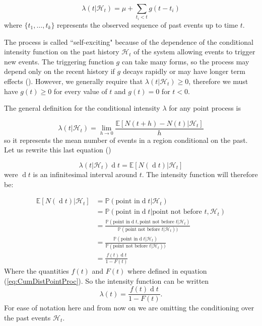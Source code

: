 \documentclass[11pt,a4paper]{article}
\renewcommand{\d}[1]{\ensuremath{\operatorname{d}\!{#1}}}
\begin{document}
\begin{equation*}
    \lambda(t|\mathcal{H}_t) = \mu + \sum_{t_i < t} g(t - t_i)
\end{equation*}
where $\{ t_1, \dots, t_k\}$ represents the observed sequence of past events up to time $t$.

The process is called ``self-exciting" because of the dependence of the conditional intensity function on the past history $\mathcal{H}_t$ of the system allowing events to trigger new events. The triggering function $g$ can take many forms, so the process may depend only on the recent history if $g$ decays rapidly or may have longer term effects (\cite{Reinhart}). However, we generally require that $\lambda(t | \mathcal{H}_t)  \geq 0$, therefore we must have $g(t) \geq 0$ for every value of $t$ and $g(t) = 0$ for $t < 0$.

The general definition for the conditional intensity $\lambda$ for any point process is

\begin{equation*}
    \lambda(t | \mathcal{H}_t) = \lim_{h \to 0} \frac{\mathbb{E}[N(t+h) - N(t) | \mathcal{H}_t]}{h}
\end{equation*}
so it represents the mean number of events in a region conditional on the past.
Let us rewrite this last equation (\cite{Rasmussen})

\begin{equation*}
    \lambda(t | \mathcal{H}_t) \d t = \mathbb{E}[N(\d t) | \mathcal{H}_t]
\end{equation*}
were $\d t$ is an infinitesimal interval around $t$.
The intensity function will therefore be:

\begin{align*}
    \mathbb{E}[N(\d t) | \mathcal{H}_t] &= \mathbb{P}(\textrm{point in} \d t | \mathcal{H}_t) \\
    & = \mathbb{P}(\textrm{point in} \d t | \textrm{point not before } t, \mathcal{H}_t) \\
    & = \frac{\mathbb{P}(\textrm{point in} \d t, \textrm{point not before } t | \mathcal{H}_t)}{\mathbb{P}(\textrm{point not before } t | \mathcal{H}_t))} \\
    & = \frac{\mathbb{P}(\textrm{point in} \d t | \mathcal{H}_t)}{\mathbb{P}(\textrm{point not before } t | \mathcal{H}_t))} \\
    & = \frac{f(t) \d t}{1 - F(t)}
\end{align*}
Where the quantities $f(t)$ and $F(t)$ where defined in equation (\ref{eq:CumDistPointProc}). So the intensity function can be written
\begin{equation}\label{eq:IntFun}
    \lambda(t) = \frac{f(t) \d t}{1 - F(t)}.
\end{equation}
For ease of notation here and from now on we are omitting the conditioning over the past events $\mathcal{H}_t$.
\end{document}
